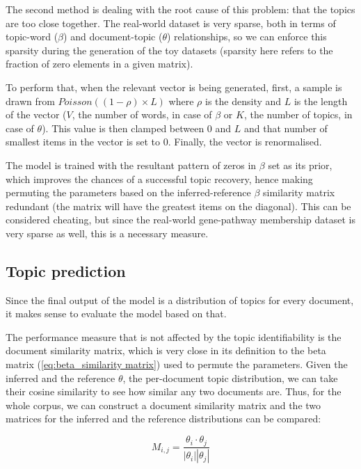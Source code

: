 \documentclass[12pt,a4paper,twoside,openright]{report}
\begin{document}
The second method is dealing with the root cause of this problem: that the topics are too close together. The real-world dataset is very sparse, both in terms of topic-word ($\beta$) and document-topic ($\theta$) relationships, so we can enforce this sparsity during the generation of the toy datasets (sparsity here refers to the fraction of zero elements in a given matrix).

To perform that, when the relevant vector is being generated, first, a sample is drawn from $\mathit{Poisson}((1-\rho) \times L)$ where $\rho$ is the density and $L$ is the length of the vector ($V$, the number of words, in case of $\beta$ or $K$, the number of topics, in case of $\theta$). This value is then clamped between 0 and $L$ and that number of smallest items in the vector is set to 0. Finally, the vector is renormalised.

The model is trained with the resultant pattern of zeros in $\beta$ set as its prior, which improves the chances of a successful topic recovery, hence making permuting the parameters based on the inferred-reference $\beta$ similarity matrix redundant (the matrix will have the greatest items on the diagonal). This can be considered cheating, but since the real-world gene-pathway membership dataset is very sparse as well, this is a necessary measure.

\subsection{Topic prediction}

Since the final output of the model is a distribution of topics for every document, it makes sense to evaluate the model based on that.

The performance measure that is not affected by the topic identifiability is the document similarity matrix, which is very close in its definition to the beta matrix (\ref{eq:beta_similarity matrix}) used to permute the parameters. Given the inferred and the reference $\theta$, the per-document topic distribution, we can take their cosine similarity to see how similar any two documents are. Thus, for the whole corpus, we can construct a document similarity matrix and the two matrices for the inferred and the reference distributions can be compared:

\begin{equation}\label{eq:document_similarity_matrix}
M_{i,j} = \frac{\theta_i \cdot \theta_j}{|\theta_i||\theta_j|}
\end{equation}
\end{document}
